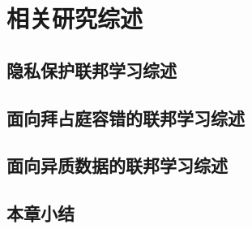 \chapter{相关研究综述}
\label{chap:main}

\section{隐私保护联邦学习综述}
\label{sec:ppfl}

\section{面向拜占庭容错的联邦学习综述}
\label{sec:byzantine}

\section{面向异质数据的联邦学习综述}
\label{sec:noniid}


\section{本章小结}

